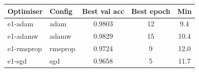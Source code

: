 \begin{tabular}{llccc}
\toprule
Optimiser & Config & Best val acc & Best epoch & Min \\
\midrule
e1-adam & adam & 0.9803 & 12 & 9.4\\
e1-adamw & adamw & 0.9829 & 15 & 10.4\\
e1-rmsprop & rmsprop & 0.9724 & 9 & 12.0\\
e1-sgd & sgd & 0.9658 & 5 & 11.7 \\
\bottomrule
\end{tabular}
